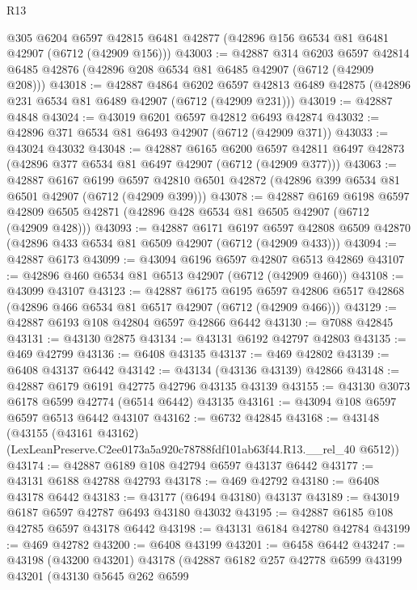 \begin{lexlean}{R13}
\begin{coremodule}
    @305
    @6204
    @6597
    @42815
    @6481
    @42877
    (@42896 @156 @6534 @81 @6481 @42907 (@6712 (@42909 @156)))
@43003 := @42887
    @314
    @6203
    @6597
    @42814
    @6485
    @42876
    (@42896 @208 @6534 @81 @6485 @42907 (@6712 (@42909 @208)))
@43018 := @42887
    @4864
    @6202
    @6597
    @42813
    @6489
    @42875
    (@42896 @231 @6534 @81 @6489 @42907 (@6712 (@42909 @231)))
@43019 := @42887 @4848
@43024 := @43019 @6201 @6597 @42812 @6493 @42874
@43032 := @42896 @371 @6534 @81 @6493 @42907 (@6712 (@42909 @371))
@43033 := @43024 @43032
@43048 := @42887
    @6165
    @6200
    @6597
    @42811
    @6497
    @42873
    (@42896 @377 @6534 @81 @6497 @42907 (@6712 (@42909 @377)))
@43063 := @42887
    @6167
    @6199
    @6597
    @42810
    @6501
    @42872
    (@42896 @399 @6534 @81 @6501 @42907 (@6712 (@42909 @399)))
@43078 := @42887
    @6169
    @6198
    @6597
    @42809
    @6505
    @42871
    (@42896 @428 @6534 @81 @6505 @42907 (@6712 (@42909 @428)))
@43093 := @42887
    @6171
    @6197
    @6597
    @42808
    @6509
    @42870
    (@42896 @433 @6534 @81 @6509 @42907 (@6712 (@42909 @433)))
@43094 := @42887 @6173
@43099 := @43094 @6196 @6597 @42807 @6513 @42869
@43107 := @42896 @460 @6534 @81 @6513 @42907 (@6712 (@42909 @460))
@43108 := @43099 @43107
@43123 := @42887
    @6175
    @6195
    @6597
    @42806
    @6517
    @42868
    (@42896 @466 @6534 @81 @6517 @42907 (@6712 (@42909 @466)))
@43129 := @42887 @6193 @108 @42804 @6597 @42866 @6442
@43130 := @7088 @42845
@43131 := @43130 @2875
@43134 := @43131 @6192 @42797 @42803
@43135 := @469 @42799
@43136 := @6408 @43135
@43137 := @469 @42802
@43139 := @6408 @43137 @6442
@43142 := @43134 (@43136 @43139) @42866
@43148 := @42887 @6179 @6191 @42775 @42796 @43135 @43139
@43155 := @43130 @3073 @6178 @6599 @42774 (@6514 @6442) @43135
@43161 := @43094 @108 @6597 @6597 @6513 @6442 @43107
@43162 := @6732 @42845
@43168 := @43148
    (@43155 (@43161 @43162) (LexLeanPreserve.C2ee0173a5a920c78788fdf101ab63f44.R13.__rel_40 @6512))
@43174 := @42887 @6189 @108 @42794 @6597 @43137 @6442
@43177 := @43131 @6188 @42788 @42793
@43178 := @469 @42792
@43180 := @6408 @43178 @6442
@43183 := @43177 (@6494 @43180) @43137
@43189 := @43019 @6187 @6597 @42787 @6493 @43180 @43032
@43195 := @42887 @6185 @108 @42785 @6597 @43178 @6442
@43198 := @43131 @6184 @42780 @42784
@43199 := @469 @42782
@43200 := @6408 @43199
@43201 := @6458 @6442
@43247 := @43198
    (@43200 @43201)
    @43178
    (@42887
      @6182
      @257
      @42778
      @6599
      @43199
      @43201
      (@43130
        @5645
        @262
        @6599

\end{coremodule}
\end{lexlean}
